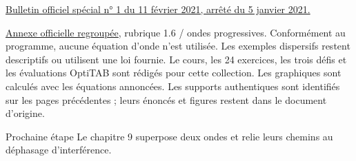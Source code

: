 \href{https://www.education.gouv.fr/bo/21/Special1/ESRS2035779A.htm}{Bulletin officiel spécial n° 1 du 11 février 2021, arrêté du 5 janvier 2021.}\par
\href{https://cache.media.education.gouv.fr/file/SPE1-MEN-MESRI-4-2-2021/64/8/spe779_annexe_1373648.pdf}{Annexe officielle regroupée}, rubrique 1.6 / ondes progressives. Conformément au programme, aucune équation d’onde n’est utilisée. Les exemples dispersifs restent descriptifs ou utilisent une loi fournie.
Le cours, les 24 exercices, les trois défis et les évaluations OptiTAB sont rédigés pour cette collection. Les graphiques sont calculés avec les équations annoncées. Les supports authentiques sont identifiés sur les pages précédentes ; leurs énoncés et figures restent dans le document d’origine.
\begin{methode}{Prochaine étape}
Le chapitre 9 superpose deux ondes et relie leurs chemins au déphasage d’interférence.
\end{methode}

